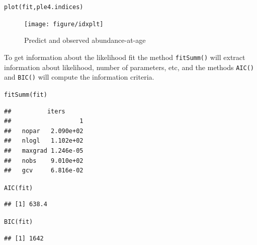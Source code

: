 \documentclass[a4paper,english,10pt]{article}\usepackage[]{graphicx}\usepackage[]{color}
\makeatletter
\newcommand{\hlstd}[1]{\textcolor[rgb]{0,0,0}{#1}}%
\newcommand{\hlkwd}[1]{\textcolor[rgb]{0.361,0.506,0.596}{#1}}%
\newenvironment{kframe}{%
 \def\at@end@of@kframe{}%
 \ifinner\ifhmode%
  \def\at@end@of@kframe{\end{minipage}}%
  \begin{minipage}{\columnwidth}%
 \fi\fi%
 \def\FrameCommand##1{\hskip\@totalleftmargin \hskip-\fboxsep
 \colorbox{shadecolor}{##1}\hskip-\fboxsep
     \hskip-\linewidth \hskip-\@totalleftmargin \hskip\columnwidth}%
 \MakeFramed {\advance\hsize-\width
   \@totalleftmargin\z@ \linewidth\hsize
   \@setminipage}}%
 {\par\unskip\endMakeFramed%
 \at@end@of@kframe}
\newenvironment{knitrout}{}{} %
\newcommand{\code}[1]{{\texttt{#1}}}
\makeatother
\begin{document}
\begin{knitrout}
\color{fgcolor}\begin{kframe}
\begin{alltt}
\hlkwd{plot}\hlstd{(fit, ple4.indices)}
\end{alltt}
\end{kframe}\begin{figure}[H]


{\centering \texttt{[image: figure/idxplt]} 

}

\caption[Predict and observed abundance-at-age]{Predict and observed abundance-at-age\label{fig:idxplt}}
\end{figure}


\end{knitrout}



To get information about the likelihood fit the method \code{fitSumm()} will extract information about likelihood, number of parameters, etc, and the methods \code{AIC()} and \code{BIC()} will compute the information criteria.

\begin{knitrout}
\color{fgcolor}\begin{kframe}
\begin{alltt}
\hlkwd{fitSumm}\hlstd{(fit)}
\end{alltt}
\begin{verbatim}
##          iters
##                   1
##   nopar   2.090e+02
##   nlogl   1.102e+02
##   maxgrad 1.246e-05
##   nobs    9.010e+02
##   gcv     6.816e-02
\end{verbatim}
\begin{alltt}
\hlkwd{AIC}\hlstd{(fit)}
\end{alltt}
\begin{verbatim}
## [1] 638.4
\end{verbatim}
\begin{alltt}
\hlkwd{BIC}\hlstd{(fit)}
\end{alltt}
\begin{verbatim}
## [1] 1642
\end{verbatim}
\end{kframe}
\end{knitrout}
\end{document}
